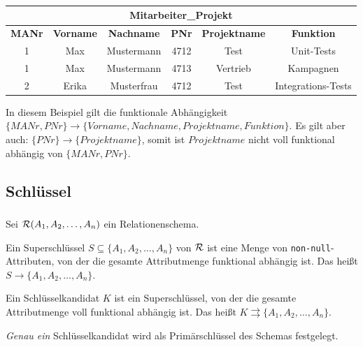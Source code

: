\begin{frame}[t]\frametitle{\insertsection}
	\framesubtitle{\insertsubsection}
	\begin{center}
		\begin{tabular}{|c|c|c|c|c|c|}\hline
			\multicolumn{6}{|c|}{\small \textbf{Mitarbeiter\_Projekt}}\\\hline\hline
			\small \textbf{MANr} & \small \textbf{Vorname}&\small \textbf{Nachname}&\small\textbf{PNr} &\small\textbf{Projektname} 
			& \small\textbf{Funktion} \\\hline
			\small 1 &\small Max & \small Mustermann &\small 4712 & \small Test &\small Unit-Tests \\\hline
			\small 1 &\small Max & \small Mustermann &\small 4713 &\small Vertrieb & \small Kampagnen \\\hline
			\small 2 &\small Erika &\small Musterfrau &\small 4712 &\small Test &\small Integrations-Tests \\\hline
		\end{tabular}
	\end{center}
	In diesem Beispiel gilt die funktionale Abhängigkeit $\{MANr, PNr\}\rightarrow\{Vorname, Nachname, Projektname, Funktion\}$.
	\nl 
	Es gilt aber auch:\nl
	$\{PNr\}\rightarrow\{Projektname\}$, somit ist $Projektname$ nicht voll funktional abhängig von $\{MANr, PNr\}$.
\end{frame}

\subsection{Schlüssel}

\begin{frame}\frametitle{\insertsection}
\framesubtitle{\insertsubsection}
Sei $\mathcal{R}(A_1,A_2,\ldots,A_n)$ ein Relationenschema.	
\begin{definition}[Superschlüssel]\label{def:superkey}
	Ein Superschlüssel $S \subseteq \{A_1,A_2,\ldots,A_n\}$ von $\mathcal{R}$ ist eine Menge von \texttt{non-null}-Attributen, 
	von der die gesamte Attributmenge funktional abh\"angig ist. Das hei\ss t $S\rightarrow \{A_1,A_2,\ldots,A_n\}$.     	
\end{definition}
%
\begin{definition}[Kandidatenschlüssel]\label{def:candkey}
	Ein Schlüsselkandidat $K$ ist ein Superschlüssel, von der die gesamte Attributmenge voll funktional abh\"angig ist. 
	Das hei\ss t $K\rightrightarrows \{A_1,A_2,\ldots,A_n\}$.     	
\end{definition}
%
\begin{definition}[Primärschlüssel]\label{def:primarykey}
	\textit{Genau ein} Schlüsselkandidat wird als Primärschlüssel des Schemas festgelegt.
\end{definition}
\end{frame}

